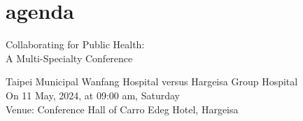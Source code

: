 \section{agenda}

\begin{center} %
    
\begin{tikzfigure}[]


\hspace{2cm}
%

\end{tikzfigure}

\end{center}


\fontsize{20}{24}  Collaborating for Public Health: \\
A Multi-Specialty Conference \\
 \par
\vspace{0.3cm}

\fontsize{12}{13} \sc
Taipei Municipal Wanfang Hospital versus Hargeisa Group Hospital\\
On 11 May, 2024, at 09:00 am, Saturday \\
Venue: Conference Hall of Carro Edeg Hotel, Hargeisa
\par






